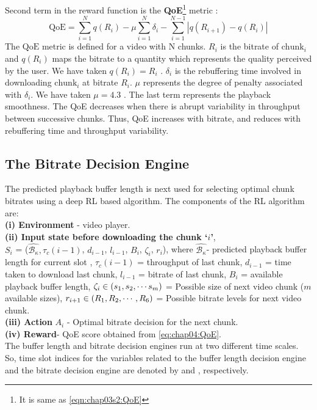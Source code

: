 \indent Second term in the reward function is the \textbf{\ac{QoE}}\footnote{It is same as \eqn\ref{eqn:chap03s2:QoE}} metric  \cite{yin2015control}:
\begin{equation}\label{eq:chap04:QoE}
   \text{QoE} = \sum_{i=1}^N q(R_i) - \mu\sum_{i=1}^N \delta_i - \sum_{i=1}^{N-1}\left|q(R_{i+1})-q(R_i)\right|
\end{equation}
The $\text{QoE}$ metric is defined for a video with N chunks. $R_i$ is the bitrate of $\text{chunk}_i$ and $q(R_i)$ maps the bitrate to a quantity which represents the quality perceived by the user. We have taken $q(R_i) = R_i$ \cite{mao2017neural}. $\delta_i$ is the rebuffering time involved in downloading $\text{chunk}_i$ at bitrate $R_i$. $\mu$ represents the degree of penalty associated with $\delta_i$.  We have taken $\mu=4.3$ \cite{mao2017neural}. The last term represents the playback smoothness. The \ac{QoE} decreases when there is abrupt variability in throughput between successive chunks. Thus, \ac{QoE} increases with bitrate, and reduces with rebuffering time and throughput variability.
\subsection{The Bitrate Decision Engine}
 \label{sec:chap04:bitrate_dec_engine}
The predicted playback buffer length is next used for selecting optimal chunk bitrates using a deep \ac{RL} based algorithm. The components of the \ac{RL} algorithm are:\\

\noindent\textbf{(i) Environment}   - video player.\\
\noindent\textbf{(ii) Input state before downloading the chunk `$i$'}, \\$S_{i}$ = ($\hat{\mathcal{B}_\kappa}, \tau_c(i-1)$, $d_{i-1}$, $l_{i-1}$, $B_{i}$, $\zeta_{i}$, $r_{i}$), where $\hat{\mathcal{B}_\kappa}$- predicted playback buffer length for current slot \mq{\kappa}, $\tau_c(i-1)$ = throughput of last chunk, $d_{i-1}$ = time taken to download last chunk, $l_{i-1}$ = bitrate of last chunk, $B_{i}$ = available playback buffer length, $\zeta_{i}\in\left({s_1,s_2,\cdots s_m}\right)$ = Possible size of next video chunk  ($m$ available sizes), $r_{i+1}\in \left({R_1, R_2,\cdots, R_6}\right)$ = Possible bitrate levels for next video chunk.\\
\noindent\textbf{(iii) Action} $A_i$ - Optimal bitrate decision for the next chunk.\\
\noindent\textbf{(iv) Reward}- \ac{QoE} score obtained from \eqn\ref{eq:chap04:QoE}.\\
\indent The buffer length and bitrate decision engines run at two different time scales. So, time slot indices for the variables related to the buffer length decision engine and the bitrate decision engine are denoted by  \mq{\kappa} and , respectively.

